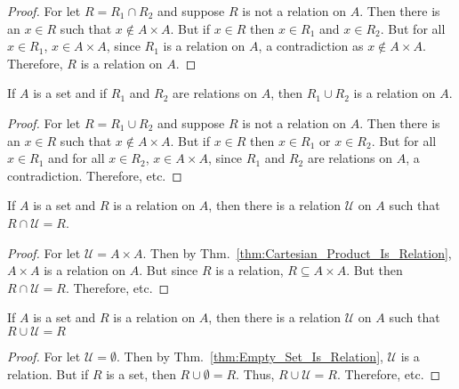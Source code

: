    \begin{proof}
        For let $R=R_{1}\cap{R}_{2}$ and suppose $R$ is not a
        relation on $A$. Then there is an $x\in{R}$ such that
        $x\notin{A}\times{A}$. But if $x\in{R}$ then
        $x\in{R}_{1}$ and $x\in{R}_{2}$. But for all
        $x\in{R}_{1}$, $x\in{A}\times{A}$, since $R_{1}$ is a
        relation on $A$, a contradiction as
        $x\notin{A}\times{A}$. Therefore, $R$ is a relation on
        $A$.
    \end{proof}
    \begin{theorem}
        \label{thm:Set_Theory_Union_of_Relations_Is_Relation}
        If $A$ is a set and if $R_{1}$ and $R_{2}$ are relations
        on $A$, then $R_{1}\cup{R}_{2}$ is a relation on $A$.
    \end{theorem}
    \begin{proof}
        For let $R=R_{1}\cup{R}_{2}$ and suppose $R$ is not a
        relation on $A$. Then there is an $x\in{R}$ such that
        $x\notin{A}\times{A}$. But if $x\in{R}$ then
        $x\in{R}_{1}$ or $x\in{R}_{2}$. But for all $x\in{R}_{1}$
        and for all $x\in{R}_{2}$,
        $x\in{A}\times{A}$, since $R_{1}$ and $R_{2}$ are
        relations on $A$, a contradiction. Therefore, etc.
    \end{proof}
    \begin{theorem}
        If $A$ is a set and $R$ is a relation on $A$, then there
        is a relation $\mathcal{U}$ on $A$ such that
        $R\cap\mathcal{U}=R$.
    \end{theorem}
    \begin{proof}
        For let $\mathcal{U}={A}\times{A}$. Then by
        Thm.~\ref{thm:Cartesian_Product_Is_Relation}, $A\times{A}$ is
        a relation on $A$. But since $R$ is a relation,
        $R\subseteq{A}\times{A}$. But then
        $R\cap\mathcal{U}=R$. Therefore, etc.
    \end{proof}
    \begin{theorem}
        If $A$ is a set and $R$ is a relation on $A$, then there
        is a relation $\mathcal{U}$ on $A$ such that
        $R\cup\mathcal{U}=R$
    \end{theorem}
    \begin{proof}
        For let $\mathcal{U}=\emptyset$. Then by
        Thm.~\ref{thm:Empty_Set_Is_Relation},
        $\mathcal{U}$ is a relation. But if $R$ is a set, then
        $R\cup\emptyset=R$. Thus, $R\cup\mathcal{U}=R$.
        Therefore, etc.
    \end{proof}
